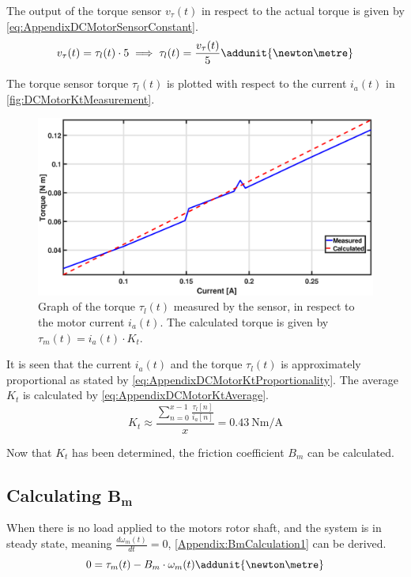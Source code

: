 The output of the torque sensor $v_\tau(t)$ in respect to the actual torque is given by \autoref{eq:AppendixDCMotorSensorConstant}.
\begin{equation}
v_\tau(t) = \tau_{l}(t) \cdot 5 \implies \tau_{l}(t) = \frac{v_\tau(t)}{5} \addunit{\newton\metre}\label{eq:AppendixDCMotorSensorConstant}
\end{equation}
\startexplain
{}
\stopexplain

The torque sensor torque $\tau_l(t)$ is plotted with respect to the current $i_a(t)$ in \autoref{fig:DCMotorKtMeasurement}.
\begin{figure}[!h]
\centering
\includegraphics[width=\textwidth]{figures/test/MotorTorqueConstantMeasurement}
\caption{Graph of the torque $\tau_l(t)$ measured by the sensor, in respect to the motor current $i_a(t)$. The calculated torque is given by $\tau_m(t) = i_a(t) \cdot K_t$.}\label{fig:DCMotorKtMeasurement}
\end{figure}

It is seen that the current $i_a(t)$ and the torque $\tau_l(t)$ is approximately proportional as stated by \autoref{eq:AppendixDCMotorKtProportionality}. The average $K_t$ is calculated by \autoref{eq:AppendixDCMotorKtAverage}.
\begin{equation}
K_t\approx \frac{\sum\limits_{n=0}^{x-1} \frac{\tau_{l}[n]}{i_{a}[n]}}{x}=\SI{0.43}{\newton\metre\per\ampere}\label{eq:AppendixDCMotorKtAverage}
\end{equation}
\startexplain
{}
\stopexplain

Now that $K_t$ has been determined, the friction coefficient $B_m$ can be calculated.

\subsection*{Calculating $\boldsymbol{B_m}$}
When there is no load applied to the motors rotor shaft, and the system is in steady state, meaning $\frac{d \omega_{m}(t)}{d t} = 0$, \autoref{Appendix:BmCalculation1} can be derived.
\begin{equation}
0 = \tau_{m}(t) - B_m \cdot \omega_{m}(t)	\addunit{\newton\metre}\label{Appendix:BmCalculation1}
\end{equation}

